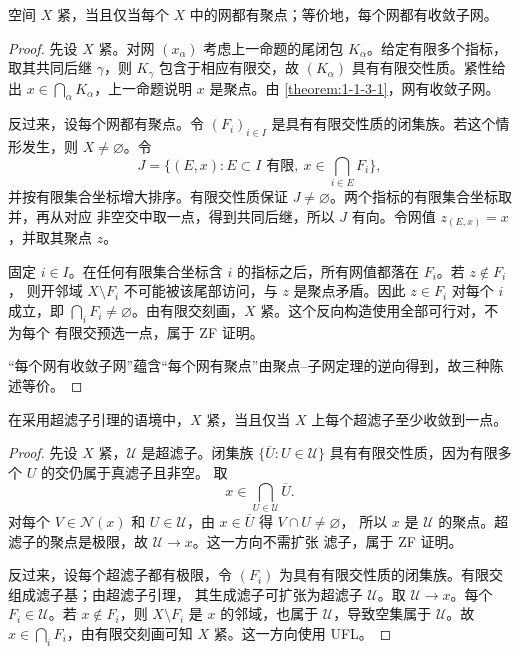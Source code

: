\begin{theorem}[网紧性定理]\label{theorem:1-2-1-1}
空间 \(X\) 紧，当且仅当每个 \(X\) 中的网都有聚点；等价地，每个网都有收敛子网。
\end{theorem}
\begin{proof}
先设 \(X\) 紧。对网 \((x_\alpha)\) 考虑上一命题的尾闭包 \(K_\alpha\)。给定有限多个指标，取其共同后继
\(\gamma\)，则 \(K_\gamma\) 包含于相应有限交，故 \((K_\alpha)\) 具有有限交性质。紧性给出
\(x\in\bigcap_\alpha K_\alpha\)，上一命题说明 \(x\) 是聚点。由
\cref{theorem:1-1-3-1}，网有收敛子网。

反过来，设每个网都有聚点。令 \((F_i)_{i\in I}\) 是具有有限交性质的闭集族。若这个情形发生，则
\(X\ne\varnothing\)。令
\[
 J=\{(E,x):E\subset I\text{ 有限},\ x\in\bigcap_{i\in E}F_i\},
\]
并按有限集合坐标增大排序。有限交性质保证 \(J\ne\varnothing\)。两个指标的有限集合坐标取并，再从对应
非空交中取一点，得到共同后继，所以 \(J\) 有向。令网值 \(z_{(E,x)}=x\)，并取其聚点 \(z\)。

固定 \(i\in I\)。在任何有限集合坐标含 \(i\) 的指标之后，所有网值都落在 \(F_i\)。若 \(z\notin F_i\)，
则开邻域 \(X\setminus F_i\) 不可能被该尾部访问，与 \(z\) 是聚点矛盾。因此 \(z\in F_i\) 对每个 \(i\)
成立，即 \(\bigcap_iF_i\ne\varnothing\)。由有限交刻画，\(X\) 紧。这个反向构造使用全部可行对，不为每个
有限交预选一点，属于 \textsf{ZF} 证明。

“每个网有收敛子网”蕴含“每个网有聚点”由聚点--子网定理的逆向得到，故三种陈述等价。
\end{proof}

\begin{theorem}[超滤子紧性定理]\label{theorem:1-2-1-2}
在采用超滤子引理的语境中，\(X\) 紧，当且仅当 \(X\) 上每个超滤子至少收敛到一点。
\end{theorem}
\begin{proof}
先设 \(X\) 紧，\(\mathcal U\) 是超滤子。闭集族
\(\{\overline U:U\in\mathcal U\}\) 具有有限交性质，因为有限多个 \(U\) 的交仍属于真滤子且非空。
取
\[
 x\in\bigcap_{U\in\mathcal U}\overline U.
\]
对每个 \(V\in\mathcal N(x)\) 和 \(U\in\mathcal U\)，由 \(x\in\overline U\) 得 \(V\cap U\ne\varnothing\)，
所以 \(x\) 是 \(\mathcal U\) 的聚点。超滤子的聚点是极限，故 \(\mathcal U\to x\)。这一方向不需扩张
滤子，属于 \textsf{ZF} 证明。

反过来，设每个超滤子都有极限，令 \((F_i)\) 为具有有限交性质的闭集族。有限交组成滤子基；由超滤子引理，
其生成滤子可扩张为超滤子 \(\mathcal U\)。取 \(\mathcal U\to x\)。每个 \(F_i\in\mathcal U\)。若
\(x\notin F_i\)，则 \(X\setminus F_i\) 是 \(x\) 的邻域，也属于 \(\mathcal U\)，导致空集属于
\(\mathcal U\)。故 \(x\in\bigcap_iF_i\)，由有限交刻画可知 \(X\) 紧。这一方向使用 \textsf{UFL}。
\end{proof}

